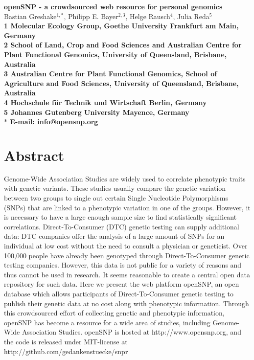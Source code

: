 \documentclass[10pt]{article}
\date{}
\begin{document}
\begin{flushleft}
{\Large
\textbf{openSNP - a crowdsourced web resource for personal genomics}
}
% 
\\
Bastian Greshake$^{1,\ast}$, 
Philipp E. Bayer$^{2,3}$, 
Helge Rausch$^{4}$,
Julia Reda$^{5}$
\\
\bf{1} Molecular Ecology Group, Goethe University Frankfurt am Main, Germany
\\
\bf{2} School of Land, Crop and Food Sciences and Australian Centre for Plant Functional Genomics, University of Queensland, Brisbane, Australia
\\
\bf{3} Australian Centre for Plant Functional Genomics, School of Agriculture and Food Sciences, University of Queensland, Brisbane, Australia
\\
\bf{4} Hochschule f\"ur Technik und Wirtschaft Berlin, Germany 
\\
\bf{5} Johannes Gutenberg University Mayence, Germany
\\
$\ast$ E-mail: info@opensnp.org
\end{flushleft}

\section*{Abstract}
Genome-Wide Association Studies are widely used to correlate phenotypic traits with genetic variants. These studies usually compare the genetic variation between two groups to single out certain Single Nucleotide Polymorphisms (SNPs) that are linked to a phenotypic variation in one of the groups. However, it is necessary to have a large enough sample size to find statistically significant correlations. Direct-To-Consumer (DTC) genetic testing can supply additional data: DTC-companies offer the analysis of a large amount of SNPs for an individual at low cost without the need to consult a physician or geneticist. Over 100,000 people have already been genotyped through Direct-To-Consumer genetic testing companies. However, this data is not public for a variety of reasons and thus cannot be used in research. It seems reasonable to create a central open data repository for such data.
Here we present the web platform openSNP, an open database which allows participants of Direct-To-Consumer genetic testing to publish their genetic data at no cost along with phenotypic information. Through this crowdsourced effort of collecting genetic and phenotypic information, openSNP has become a 
resource for a wide area of studies, including Genome-Wide Association Studies. openSNP is hosted at http://www.opensnp.org, and the code is released under MIT-license at http://github.com/gedankenstuecke/snpr
\end{document}
